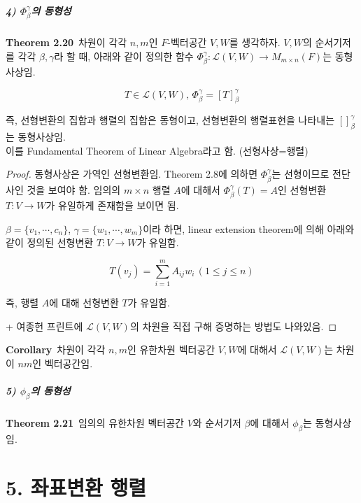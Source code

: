 \documentclass[10pt, a4paper]{article}
\begin{document}
\newpage


\subsubsection*{4) $\Phi^{\gamma}_{\beta}$의 동형성}
\textbf{Theorem 2.20}\, 차원이 각각 $n,m$인 $F$-벡터공간 $V,W$를 생각하자. $V,W$의 순서기저를 각각 $\beta,\gamma$라 할 때, 아래와 같이 정의한 함수 $\Phi^{\gamma}_{\beta}:\mathcal{L}(V,W) \rightarrow M_{m \times n}(F)$는 동형사상임.

\[
T \in \mathcal{L}(V,W),\,\Phi^{\gamma}_{\beta}=[T]^{\gamma}_{\beta}
\]

즉, 선형변환의 집합과 행렬의 집합은 동형이고, 선형변환의 행렬표현을 나타내는 $[]_{\beta}^{\gamma}$는 동형사상임.\\
이를 Fundamental Theorem of Linear Algebra라고 함. (선형사상=행렬)

\begin{proof}
동형사상은 가역인 선형변환임. Theorem 2.8에 의하면 $\Phi^{\gamma}_{\beta}$는 선형이므로 전단사인 것을 보여야 함. 임의의 $m \times n$ 행렬 $A$에 대해서 $\Phi^{\gamma}_{\beta}(T)=A$인 선형변환 $T:V \rightarrow W$가 유일하게 존재함을 보이면 됨.

$\beta=\{v_1, \cdots ,c_n\}$, $\gamma=\{w_1, \cdots ,w_m\}$이라 하면, linear extension theorem에 의해 아래와 같이 정의된 선형변환 $T:V \rightarrow W$가 유일함.

\[
T(v_j)=\sum_{i=1}^{m}A_{ij}w_i\,(1 \leq j \leq n)
\]

즉, 행렬 $A$에 대해 선형변환 $T$가 유일함.

+ 여종헌 프린트에 $\mathcal{L}(V,W)$의 차원을 직접 구해 증명하는 방법도 나와있음.
\end{proof}

\textbf{Corollary}\, 차원이 각각 $n,m$인 유한차원 벡터공간 $V,W$에 대해서 $\mathcal{L}(V,W)$는 차원이 $nm$인 벡터공간임.

\subsubsection*{5) $\phi_{\beta}$의 동형성}
\textbf{Theorem 2.21}\, 임의의 유한차원 벡터공간 $V$와 순서기저 $\beta$에 대해서 $\phi_{\beta}$는 동형사상임.


\newpage

\part*{5. 좌표변환 행렬}
\end{document}
